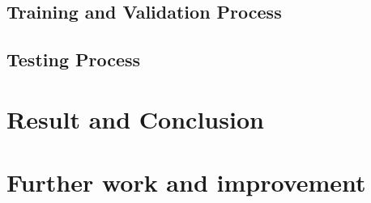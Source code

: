 \documentclass[a4paper, 12pt]{article}
\begin{document}
\begin{sloppypar}
  \subsection{Training and Validation Process}
  
  \subsection{Testing Process}
  
  \section{Result and Conclusion}
  
  \section{Further work and improvement}
  
\clearpage
\printbibliography[heading=bibintoc]
\clearpage

\end{sloppypar}
\end{document}

